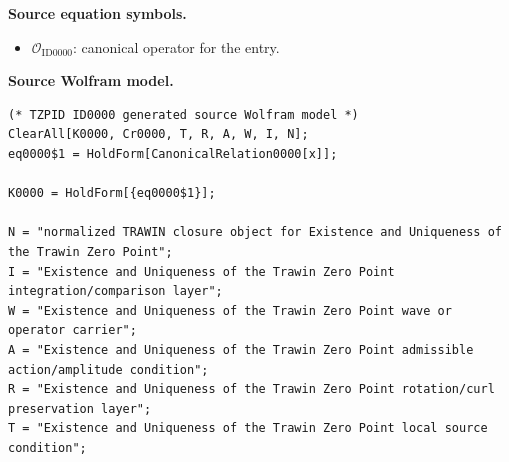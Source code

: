 \begin{minipage}[t]{0.49\linewidth}
\begin{minipage}[t]{0.49\linewidth}
\begin{minipage}[t]{0.49\linewidth}
\begin{minipage}[t]{0.49\linewidth}
\begin{minipage}[t]{0.49\linewidth}
\begin{minipage}[t]{0.49\linewidth}
\begin{minipage}[t]{0.49\linewidth}
\begin{minipage}[t]{0.49\linewidth}
\begin{minipage}[t]{0.49\linewidth}
\begin{minipage}[t]{0.49\linewidth}
\begin{minipage}[t]{0.49\linewidth}
\begin{minipage}[t]{0.49\linewidth}
\begin{minipage}[t]{0.49\linewidth}
\begin{minipage}[t]{0.49\linewidth}
\begin{minipage}[t]{0.49\linewidth}
\begin{minipage}[t]{0.49\linewidth}
\begin{minipage}[t]{0.49\linewidth}
\begin{minipage}[t]{0.49\linewidth}
\begin{minipage}[t]{0.49\linewidth}
\begin{minipage}[t]{0.49\linewidth}
\begin{minipage}[t]{0.49\linewidth}
\begin{minipage}[t]{0.49\linewidth}
\begin{minipage}[t]{0.49\linewidth}
\begin{minipage}[t]{0.49\linewidth}
\begin{minipage}[t]{0.49\linewidth}
\begin{minipage}[t]{0.49\linewidth}
\begin{minipage}[t]{0.49\linewidth}
\begin{minipage}[t]{0.49\linewidth}
\begin{minipage}[t]{0.49\linewidth}
\begin{minipage}[t]{0.49\linewidth}
\begin{minipage}[t]{0.49\linewidth}
\begin{minipage}[t]{0.49\linewidth}
\begin{minipage}[t]{0.49\linewidth}
\begingroup
\small
\raggedright
\textbf{Source equation symbols.}\par
\begin{itemize}[leftmargin=1.35em,itemsep=1pt,topsep=1pt,parsep=0pt]
    \item $\mathcal{O}_{\mathrm{ID0000}}$: canonical operator for the entry.
\end{itemize}
\endgroup
\end{minipage}\hfill
\begin{minipage}[t]{0.47\linewidth}
\begingroup
\scriptsize
\raggedright
\textbf{Source Wolfram model.}\par
\begin{Verbatim}[fontsize=\tiny,breaklines=true,breakanywhere=true]
(* TZPID ID0000 generated source Wolfram model *)
ClearAll[K0000, Cr0000, T, R, A, W, I, N];
eq0000$1 = HoldForm[CanonicalRelation0000[x]];

K0000 = HoldForm[{eq0000$1}];

N = "normalized TRAWIN closure object for Existence and Uniqueness of the Trawin Zero Point";
I = "Existence and Uniqueness of the Trawin Zero Point integration/comparison layer";
W = "Existence and Uniqueness of the Trawin Zero Point wave or operator carrier";
A = "Existence and Uniqueness of the Trawin Zero Point admissible action/amplitude condition";
R = "Existence and Uniqueness of the Trawin Zero Point rotation/curl preservation layer";
T = "Existence and Uniqueness of the Trawin Zero Point local source condition";


\end{Verbatim}
\end{minipage}
\end{minipage}
\end{minipage}
\end{minipage}
\end{minipage}
\end{minipage}
\end{minipage}
\end{minipage}
\end{minipage}
\end{minipage}
\end{minipage}
\end{minipage}
\end{minipage}
\end{minipage}
\end{minipage}
\end{minipage}
\end{minipage}
\end{minipage}
\end{minipage}
\end{minipage}
\end{minipage}
\end{minipage}
\end{minipage}
\end{minipage}
\end{minipage}
\end{minipage}
\end{minipage}
\end{minipage}
\end{minipage}
\end{minipage}
\end{minipage}
\end{minipage}
\end{minipage}
